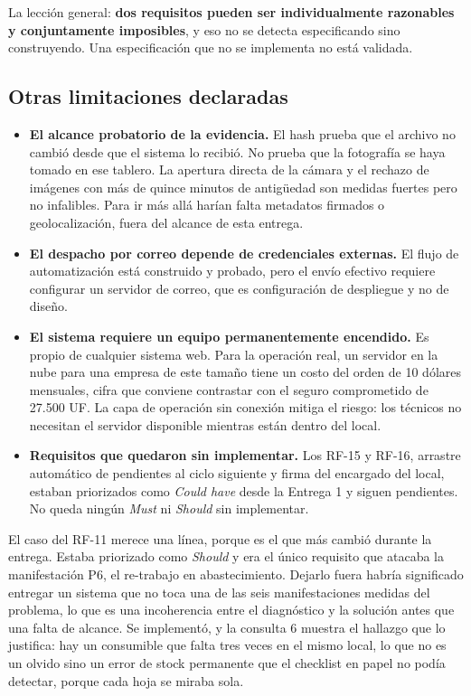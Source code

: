 \documentclass[10pt,letterpaper]{article}
\begin{document}
La lección general: \textbf{dos requisitos pueden ser individualmente
razonables y conjuntamente imposibles}, y eso no se detecta especificando sino construyendo. Una especificación que no se implementa no está validada.

\subsection{Otras limitaciones declaradas}
\begin{itemize}
\item \textbf{El alcance probatorio de la evidencia.} El hash prueba que el archivo no cambió desde que el sistema lo recibió. No prueba que la fotografía se haya tomado en ese tablero. La apertura directa de la cámara y el rechazo de imágenes con más de quince minutos de antigüedad son medidas fuertes pero no infalibles. Para ir más allá harían falta metadatos firmados o geolocalización, fuera del alcance de esta entrega.
\item \textbf{El despacho por correo depende de credenciales externas.} El flujo de automatización está construido y probado, pero el envío efectivo requiere configurar un servidor de correo, que es configuración de despliegue y no de diseño.
\item \textbf{El sistema requiere un equipo permanentemente encendido.} Es propio de cualquier sistema web. Para la operación real, un servidor en la nube para una empresa de este tamaño tiene un costo del orden de 10 dólares mensuales, cifra que conviene contrastar con el seguro comprometido de 27.500 UF. La capa de operación sin conexión mitiga el riesgo: los técnicos no necesitan el servidor disponible mientras están dentro del local.
\item \textbf{Requisitos que quedaron sin implementar.} Los RF-15 y RF-16, arrastre automático de pendientes al ciclo siguiente y firma del encargado del local, estaban priorizados como \emph{Could have} desde la Entrega 1 y siguen pendientes. No queda ningún \emph{Must} ni \emph{Should} sin implementar.
\end{itemize}

El caso del RF-11 merece una línea, porque es el que más cambió durante la
entrega. Estaba priorizado como \emph{Should} y era el único requisito que
atacaba la manifestación P6, el re-trabajo en abastecimiento. Dejarlo fuera
habría significado entregar un sistema que no toca una de las seis
manifestaciones medidas del problema, lo que es una incoherencia entre el
diagnóstico y la solución antes que una falta de alcance. Se implementó, y la
consulta 6 muestra el hallazgo que lo justifica: hay un consumible que falta
tres veces en el mismo local, lo que no es un olvido sino un error de stock
permanente que el checklist en papel no podía detectar, porque cada hoja se
miraba sola.
\end{document}
